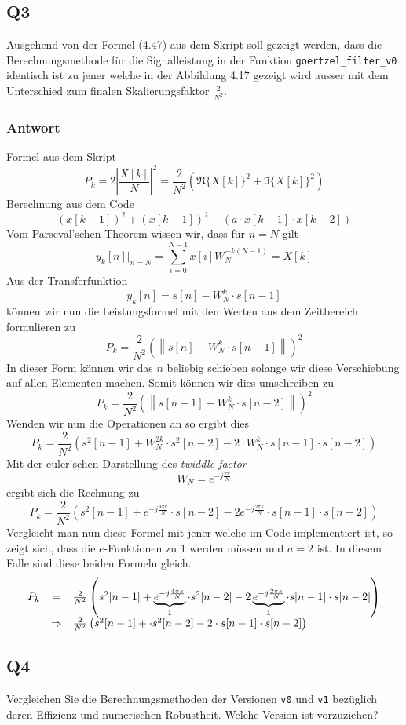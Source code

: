 \subsection{Q3}

Ausgehend von der Formel (4.47) aus dem Skript soll gezeigt werden, dass die
Berechnungsmethode für die Signalleistung in der Funktion
\lstinline{goertzel_filter_v0} identisch ist zu jener welche in der Abbildung
4.17 gezeigt wird ausser mit dem Unterschied zum finalen Skalierungsfaktor 
$\frac{2}{N^2}$.

\subsubsection*{Antwort}
Formel aus dem Skript
\[
	P_k
	= 2 \left| \frac{X[k]}{N} \right|^2
	= \frac{2}{N^2} \left( \Re\{X[k]\}^2 + \Im\{X[k]\}^2 \right)
\]
Berechnung aus dem Code
\[
	\left( x[k-1] \right)^2
		+ \left( x[k-1] \right)^2
		- \left( a \cdot x[k-1] \cdot x[k-2] \right)
\]
Vom Parseval'schen Theorem wissen wir, dass für $n = N$ gilt
\[
	y_k[n] |_{n=N}
	= \sum_{i=0}^{N-1} x[i] W_N^{-k(N-1)}
	= X[k]
\]
Aus der Transferfunktion
\[
	y_k[n] = s[n] - W_N^k \cdot s[n-1]
\]
können wir nun die Leistungsformel mit den Werten aus dem Zeitbereich
formulieren zu
\[
	P_k = \frac{2}{N^2} \left(
		\left\lVert s[n] - W_N^k \cdot s[n-1] \right\rVert
	\right)^2
\]
In dieser Form können wir das $n$ beliebig schieben solange wir diese
Verschiebung auf allen Elementen machen. Somit können wir dies umschreiben zu
\[
	P_k = \frac{2}{N^2} \left(
		\left\lVert s[n-1] - W_N^k \cdot s[n-2] \right\rVert
	\right)^2
\]
Wenden wir nun die Operationen an so ergibt dies
\[
	P_k
	= \frac{2}{N^2} \left(
		s^2[n-1] + W_N^{2k} \cdot s^2[n-2]
		- 2 \cdot W_N^k \cdot s[n-1] \cdot s[n-2]
	\right)
\]
Mit der euler'schen Darstellung des \emph{twiddle factor}
\[
	W_N = e^{-j\frac{2 \pi}{N}}
\] 
ergibt sich die Rechnung zu
\[
	P_k
	= \frac{2}{N^2} \left(
		s^2[n-1] + e^{-j\frac{4 \pi k}{N}} \cdot s[n-2]
		- 2 e^{-j\frac{2 \pi k}{N}} \cdot s[n-1] \cdot s[n-2] 
	\right)
\]
Vergleicht man nun diese Formel mit jener welche im Code implementiert ist,
so zeigt sich, dass die $e$-Funktionen zu 1 werden müssen und $a=2$ ist. In
diesem Falle sind diese beiden Formeln gleich.
\[
	\begin{array}{r c l}
	P_k & = & \frac{2}{N^2} \left(
		s^2[n-1] +
		\underbrace{e^{-j\frac{4 \pi k}{N}}}_{1} \cdot s^2[n-2]
		- 2 \underbrace{e^{-j\frac{2 \pi k}{N}}}_{1} \cdot s[n-1] \cdot s[n-2] 
	\right) \\
	& \Rightarrow & \frac{2}{N^2} \left(
		s^2[n-1] + \cdot s^2[n-2] - 2 \cdot s[n-1] \cdot s[n-2] 
	\right)
	\end{array}
\]

\subsection{Q4}

Vergleichen Sie die Berechnungsmethoden der Versionen \lstinline{v0} und
\lstinline{v1} bezüglich deren Effizienz und numerischen Robustheit.
Welche Version ist vorzuziehen?
